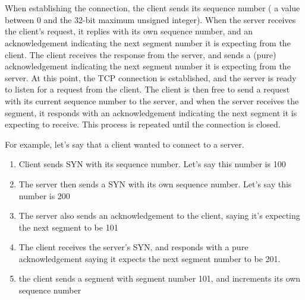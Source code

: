 \section{}

When establishing the connection, the client sends its sequence number (
a value between 0 and the 32-bit maximum unsigned integer). When the server
receives the client's request, it replies with its own sequence number, and an
acknowledgement indicating the next segment number it is expecting from the
client. The client receives the response from the server, and sends a
(pure) acknowledgement indicating the next segment number it is expecting from
the server. At this point, the TCP connection is established, and the server is 
ready to listen for a request from the client.
The client is then free to send a request with its current sequence number to
the server, and when the server receives the segment, it responds with an
acknowledgement indicating the next segment it is expecting to receive. This
process is repeated until the connection is closed. 

For example, let's say that a client wanted to connect to a server.

\begin{enumerate}
  \item Client sends SYN with its sequence number. Let's say this number is 100
  \item The server then sends a SYN with its own sequence number. Let's say this
    number is 200
  \item The server also sends an acknowledgement to the client, saying it's
    expecting the next segment to be 101
  \item The client receives the server's SYN, and responds with a pure
    acknowledgement saying it expects the next segment number to be 201.
  \item the client sends a segment with segment number 101, and increments its
    own sequence number
\end{enumerate}
